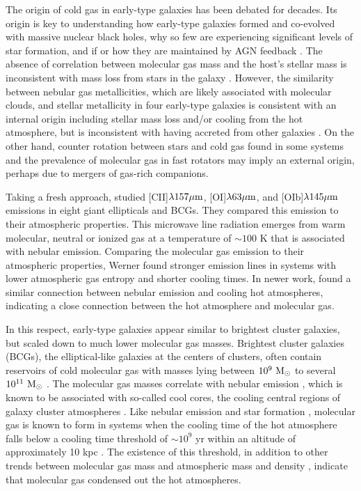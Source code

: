 \documentclass[iop]{emulateapj}
\begin{document}
The origin of cold gas in early-type galaxies has been debated for decades.  Its origin is key to understanding how early-type galaxies formed and co-evolved with massive nuclear black holes, why so few are experiencing significant levels of star formation, and if or how they are maintained by AGN feedback \citep{Kormendy:13}. The absence of correlation between molecular gas mass and the host's stellar mass is inconsistent with mass loss from stars in the galaxy \citep{Combes:07}.  However, the similarity between nebular gas metallicities, which are likely associated with molecular clouds, and stellar metallicity in four early-type galaxies is consistent with an internal origin including stellar mass loss and/or cooling from the hot atmosphere, but is inconsistent with having accreted from other galaxies \citep{Griffith:18}. On the other hand, counter rotation between stars and cold gas found in some systems and the prevalence of molecular gas in fast rotators \citep{Young:11} may imply an external origin, perhaps due to mergers of gas-rich companions.   

Taking a fresh approach, \citet{Werner:14} studied [CII]$\lambda 157 \mu \rm m$,  [OI]$\lambda 63 \mu \rm m$, and [OIb]$\lambda 145 \mu \rm m$ emissions in eight giant ellipticals and BCGs.  They compared this emission to their atmospheric properties. This microwave line radiation emerges from warm molecular, neutral or ionized gas at a temperature of $\sim 100$ K that is associated with nebular emission. Comparing the molecular gas emission to their atmospheric properties, Werner found stronger emission lines in systems with lower atmospheric gas entropy and shorter cooling times. In newer work, \citet{Werner:18new} found a similar connection between nebular emission and cooling hot atmospheres,  indicating a close connection between the hot atmosphere and molecular gas.

In this respect, early-type galaxies appear similar to brightest cluster galaxies, but scaled down to much lower molecular gas masses.  Brightest cluster galaxies (BCGs), the elliptical-like galaxies at the centers of clusters, often contain reservoirs of cold molecular gas with masses lying between $10^9~\rm M_\odot$ to several $10^{11}~\rm M_\odot$  \citep{Edge:01, Salome:03}. The molecular gas masses correlate with nebular emission \citep{Edge:01}, which is known to be  associated with so-called cool cores, the cooling central regions of galaxy cluster atmospheres \citep{Heckman:89, Hu:85, Crawford:99, Cavagnolo:08, McDonald:10}. Like nebular emission  and star formation \citep{Rafferty:08}, molecular gas is known to form in systems when the cooling time of the hot atmosphere falls below a cooling time threshold of $\sim 10^9$ yr within an altitude of approximately 10 kpc \citep{Pulido:17}. The existence of this threshold, in addition to other trends between molecular gas mass and atmospheric mass and density \citep{Pulido:17}, indicate that molecular gas condensed out the hot atmospheres. 
\end{document}
